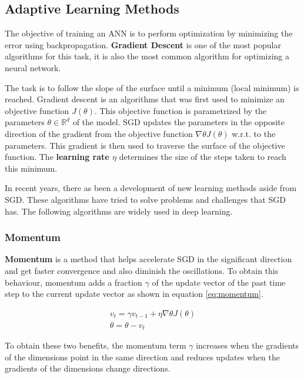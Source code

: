 \subsection{Adaptive Learning Methods}

The objective of training an ANN is to perform optimization by minimizing the error using backpropagation. \textbf{Gradient Descent} is one of the most popular algorithms for this task, it is also the most common algorithm for optimizing a neural network.

The task is to follow the slope of the surface until a minimum (local minimum) is reached. Gradient descent is an algorithms that was first used to minimize an objective function $J(\theta)$. This objective function is parametrized by the parameters $\theta\in\mathbb{R}^d$ of the model. SGD updates the parameters in the opposite direction of the gradient from the objective function $\nabla\theta J(\theta)$ w.r.t. to the parameters. This gradient is then used to traverse the surface of the objective function. The \textbf{learning rate $\eta$} determines the size of the steps taken to reach this minimum. \cite{Ruder2016AnAlgorithms}

In recent years, there as been a development of new learning methods aside from SGD. These algorithms have tried to solve problems and challenges that SGD has. The following algorithms are widely used in deep learning.

\subsubsection{Momentum}
\textbf{Momentum} is a method that helps accelerate SGD in the significant direction and get faster convergence and also diminish the oscillations. To obtain this behaviour, momentum adds a fraction $\gamma$ of the update vector of the past time step to the current update vector as shown in equation \ref{eq:momentum}. \cite{Sutton1986TwoNetworks}

\begin{equation} \begin{split} \label{eq:momentum}
    v_{t} = \gamma v_{t-1} + \eta\nabla{\theta}J(\theta) \\
	\theta= \theta - v_{t}
\end{split} \end{equation}

To obtain these two benefits, the momentum term $\gamma$ increases when the gradients of the dimensions point in the same direction and reduces updates when the gradients of the dimensions change directions. \cite{Ruder2016AnAlgorithms}

